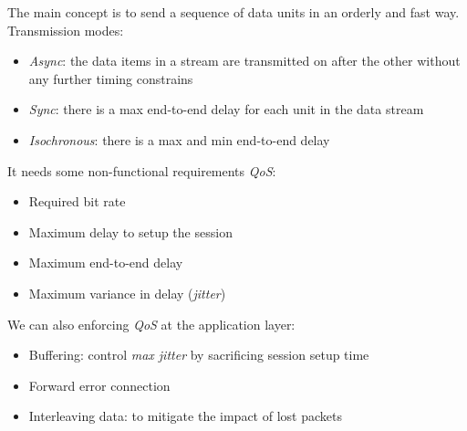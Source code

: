 The main concept is to send a sequence of data units in an orderly and fast way.\\
Transmission modes:
\begin{itemize}
    \item \textit{Async}: the data items in a stream are transmitted on after the other without any further timing constrains
    \item \textit{Sync}: there is a max end-to-end delay for each unit in the data stream
    \item \textit{Isochronous}: there is a max and min end-to-end delay
\end{itemize}
It needs some non-functional requirements \emph{QoS}:
\begin{itemize}
    \item Required bit rate
    \item Maximum delay to setup the session
    \item Maximum end-to-end delay
    \item Maximum variance in delay (\textit{jitter})
\end{itemize}
We can also enforcing \emph{QoS} at the application layer:
\begin{itemize}
    \item Buffering: control \textit{max jitter} by sacrificing session setup time
    \item Forward error connection
    \item Interleaving data: to mitigate the impact of lost packets
\end{itemize}
